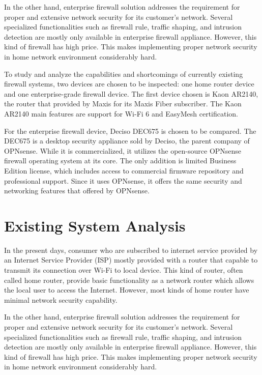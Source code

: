 \documentclass[../index.tex]{subfiles}
\begin{document}
In the other hand, enterprise firewall solution addresses the requirement for proper and extensive
network security for its customer’s network. Several specialized functionalities such as firewall
rule, traffic shaping, and intrusion detection are mostly only available in enterprise firewall
appliance. However, this kind of firewall has high price. This makes implementing proper network
security in home network environment considerably hard.

To study and analyze the capabilities and shortcomings of currently existing firewall systems, two
devices are chosen to be inspected: one home router device and one enterprise-grade firewall device.
The first device chosen is Kaon AR2140, the router that provided by Maxis for its Maxis Fiber
subscriber. The Kaon AR2140 main features are support for Wi-Fi 6 and EasyMesh certification.

For the enterprise firewall device, Deciso DEC675 is chosen to be compared. The DEC675 is a desktop
security appliance sold by Deciso, the parent company of OPNsense. While it is commercialized, it
utilizes the open-source OPNsense firewall operating system at its core. The only addition is
limited Business Edition license, which includes access to commercial firmware repository and
professional support. Since it uses OPNsense, it offers the same security and networking features
that offered by OPNsense.

\section{Existing System Analysis}

In the present days, consumer who are subscribed to internet service provided by an Internet Service
Provider (ISP) mostly provided with a router that capable to transmit its connection over Wi-Fi to
local device. This kind of router, often called home router, provide basic functionality as a
network router which allows the local user to access the Internet. However, most kinds of home
router have minimal network security capability.

In the other hand, enterprise firewall solution addresses the requirement for proper and extensive
network security for its customer’s network. Several specialized functionalities such as firewall
rule, traffic shaping, and intrusion detection are mostly only available in enterprise firewall
appliance. However, this kind of firewall has high price. This makes implementing proper network
security in home network environment considerably hard.
\end{document}

